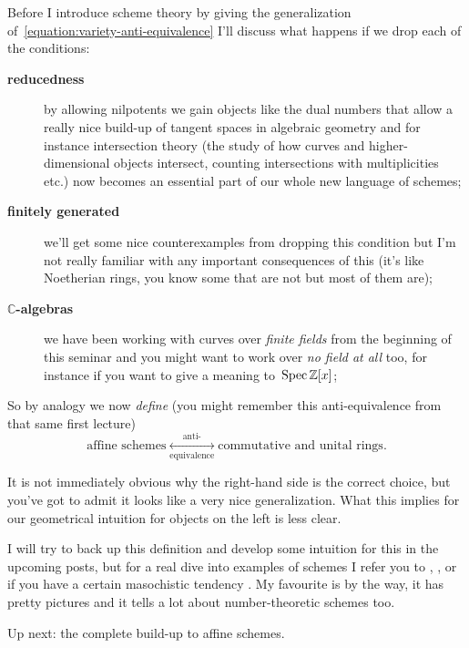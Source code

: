 Before I introduce scheme theory by giving the generalization of~\eqref{equation:variety-anti-equivalence} I'll discuss what happens if we drop each of the conditions:
\begin{description}
  \item[\textbf{reducedness}] by allowing nilpotents we gain objects like the dual numbers that allow a really nice build-up of tangent spaces in algebraic geometry and for instance intersection theory (the study of how curves and higher-dimensional objects intersect, counting intersections with multiplicities etc.) now becomes an essential part of our whole new language of schemes;
  \item[\textbf{finitely generated}] we'll get some nice counterexamples from dropping this condition but I'm not really familiar with any important consequences of this (it's like Noetherian rings, you know some that are not but most of them are);
  \item[\textbf{$\mathbb{C}$-algebras}] we have been working with curves over \emph{finite fields} from the beginning of this seminar and you might want to work over \emph{no field at all} too, for instance if you want to give a meaning to~$\operatorname{Spec}\mathbb{Z}[x]$;
\end{description}

So by analogy we now \emph{define} (you might remember this anti-equivalence from that same first lecture)
\begin{equation}
  \text{affine schemes} \underset{\text{equivalence}}{\overset{\text{anti-}}{\longleftrightarrow}} \text{commutative and unital rings}.
  \label{equation:scheme-anti-equivalence}
\end{equation}

It is not immediately obvious why the right-hand side is the correct choice, but you've got to admit it looks like a very nice generalization. What this implies for our geometrical intuition for objects on the left is less clear.

I will try to back up this definition and develop some intuition for this in the upcoming posts, but for a real dive into examples of schemes I refer you to \cite{geometry-of-schemes}, \cite{foag}, \cite{red-book} or if you have a certain masochistic tendency \cite{hartshorne}. My favourite is \cite{foag} by the way, it has pretty pictures and it tells a lot about number-theoretic schemes too.

Up next: the complete build-up to affine schemes.

